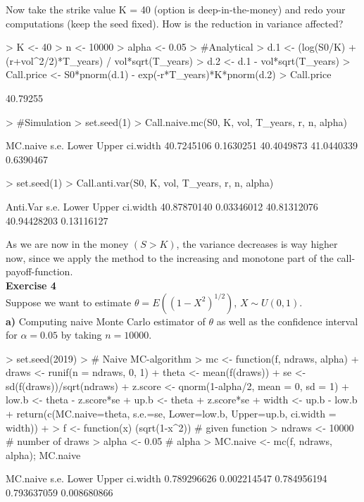 \documentclass{article}
\begin{document}
Now take the strike value K = 40 (option is deep-in-the-money) and redo your computations (keep the seed fixed).
How is the reduction in variance affected?
\begin{Schunk}
\begin{Sinput}
> K <- 40
> n <- 10000
> alpha <- 0.05
> #Analytical
> d.1 <- (log(S0/K) + (r+vol^2/2)*T_years) / vol*sqrt(T_years)
> d.2 <- d.1 - vol*sqrt(T_years)
> Call.price <- S0*pnorm(d.1) - exp(-r*T_years)*K*pnorm(d.2)
> Call.price
\end{Sinput}
\begin{Soutput}
[1] 40.79255
\end{Soutput}
\begin{Sinput}
> #Simulation
> set.seed(1)
> Call.naive.mc(S0, K, vol, T_years, r, n, alpha)
\end{Sinput}
\begin{Soutput}
  MC.naive       s.e.      Lower      Upper   ci.width 
40.7245106  0.1630251 40.4049873 41.0440339  0.6390467 
\end{Soutput}
\begin{Sinput}
> set.seed(1)
> Call.anti.var(S0, K, vol, T_years, r, n, alpha)
\end{Sinput}
\begin{Soutput}
   Anti.Var        s.e.       Lower       Upper    ci.width 
40.87870140  0.03346012 40.81312076 40.94428203  0.13116127 
\end{Soutput}
\end{Schunk}

As we are now in the money $(S>K)$, the variance decreases is way higher now, since we apply the method to the increasing and monotone part of the call-payoff-function.\\


\newpage
\textbf{Exercise 4} \\
Suppose we want to estimate $\theta = E((1-X^2)^{1/2})$, $X \sim U(0,1)$. \\

\textbf{a)} Computing naive Monte Carlo estimator of $\theta$ as well as the confidence interval for $\alpha = 0.05$ by taking $n = 10000$. 
\begin{Schunk}
\begin{Sinput}
> set.seed(2019)
> # Naive MC-algorithm
> mc <- function(f, ndraws, alpha) {
+   draws <- runif(n = ndraws, 0, 1)
+   theta <- mean(f(draws))
+   se <- sd(f(draws))/sqrt(ndraws)
+   z.score <- qnorm(1-alpha/2, mean = 0, sd = 1)
+   low.b <- theta - z.score*se
+   up.b <- theta + z.score*se
+   width <- up.b - low.b
+   return(c(MC.naive=theta, s.e.=se, Lower=low.b, Upper=up.b, ci.width = width))
+ }
> f <- function(x) (sqrt(1-x^2)) # given function
> ndraws <- 10000 # number of draws
> alpha <- 0.05 # alpha 
> MC.naive <- mc(f, ndraws, alpha); MC.naive
\end{Sinput}
\begin{Soutput}
   MC.naive        s.e.       Lower       Upper    ci.width 
0.789296626 0.002214547 0.784956194 0.793637059 0.008680866 
\end{Soutput}
\end{Schunk}
\end{document}
